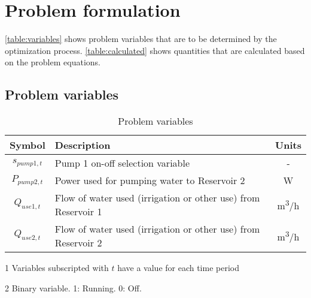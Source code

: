 \section{Problem formulation}
\label{sec:problem-formulation}

\autoref{table:variables} shows problem variables that are to be determined by the optimization process.
\autoref{table:calculated} shows quantities that are calculated based on the problem equations.

\subsection{Problem variables}



\begin{table}[htb]
	\begin{threeparttable}[b]
		\caption{Problem variables}
		\label{table:variables}
		\begin{tabular}{cp{}c}
			\toprule 
			Symbol & Description & Units \\
			\midrule
			$s_{pump1,t}$ & Pump 1 on-off selection variable\tnote{2} & - \\
			$P_{pump2,t}$ & Power used for pumping water to Reservoir 2 & \si{W} \\
			$Q_{use1,t}$ & Flow of water used (irrigation or other use) from Reservoir 1 & \si{m^3/h} \\
			$Q_{use2,t}$ & Flow of water used (irrigation or other use) from Reservoir 2 & \si{m^3/h} \\
			\bottomrule
		\end{tabular}
		\begin{tablenotes}
			\footnotesize
			\item [1] Variables subscripted with $t$ have a value for each time period
			\item [2] Binary variable. 1: Running. 0: Off.
		\end{tablenotes}
	\end{threeparttable}
\end{table}

